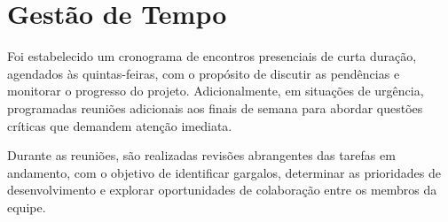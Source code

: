 \section{Gestão de Tempo}

Foi estabelecido um cronograma de encontros presenciais de curta duração, agendados às quintas-feiras, com o propósito de discutir as pendências e monitorar o progresso do projeto. Adicionalmente, em situações de urgência, programadas reuniões adicionais aos finais de semana para abordar questões críticas que demandem atenção imediata.

Durante as reuniões, são realizadas revisões abrangentes das tarefas em andamento, com o objetivo de identificar gargalos, determinar as prioridades de desenvolvimento e explorar oportunidades de colaboração entre os membros da equipe.
